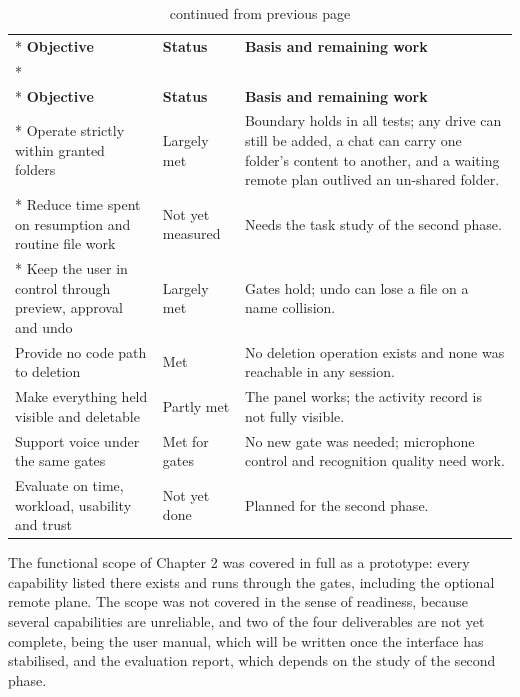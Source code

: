 \documentclass{FastFyp}
\begin{document}
{\small
{}
\begin{longtable}{|p{4.6cm}|p{2.3cm}|p{7.3cm}|}
\caption{Status of the project objectives.}\label{tab:objectives}\\*
\hline
\textbf{Objective} & \textbf{Status} & \textbf{Basis and remaining work} \\*
\hline
\endfirsthead
\caption[]{continued from previous page}\\*
\hline
\textbf{Objective} & \textbf{Status} & \textbf{Basis and remaining work} \\*
\hline
\endhead
\hline
Operate strictly within granted folders & Largely met & Boundary holds in all tests; any drive can still be added, a chat can carry one folder's content to another, and a waiting remote plan outlived an un-shared folder. \\*
\hline
Reduce time spent on resumption and routine file work & Not yet measured & Needs the task study of the second phase. \\*
\hline
Keep the user in control through preview, approval and undo & Largely met & Gates hold; undo can lose a file on a name collision. \\
\hline
Provide no code path to deletion & Met & No deletion operation exists and none was reachable in any session. \\
\hline
Make everything held visible and deletable & Partly met & The panel works; the activity record is not fully visible. \\
\hline
Support voice under the same gates & Met for gates & No new gate was needed; microphone control and recognition quality need work. \\
\hline
Evaluate on time, workload, usability and trust & Not yet done & Planned for the second phase. \\
\hline
\end{longtable}
}

The functional scope of Chapter 2 was covered in full as a prototype: every capability listed there exists and runs through the gates, including the optional remote plane. The scope was not covered in the sense of readiness, because several capabilities are unreliable, and two of the four deliverables are not yet complete, being the user manual, which will be written once the interface has stabilised, and the evaluation report, which depends on the study of the second phase.
\end{document}
